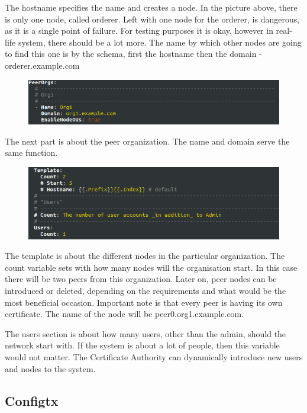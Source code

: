 \documentclass[a4paper,11pt]{report}
\begin{document}
The hostname specifies the name and creates a node. In the picture above, there is only one node, called orderer. Left with one node for the orderer, is dangerous, as it is a single point of failure. For testing purposes it is okay, however in real-life system, there should be a lot more. The name by which other nodes are going to find this one is by the schema, first the hostname then the domain - orderer.example.com

\begin{figure}[h]
\centering
  \includegraphics[width = 16cm]{cryptoconfig2.png}
  \caption{ }
  \label{cryptoconfig2}
\end{figure}

The next part is about the peer organization. The name and domain serve the same function. 

\begin{figure}[h]
\centering
  \includegraphics[width = 16cm]{cryptoconfig3.png}
  \caption{ }
  \label{cryptoconfig3}
\end{figure}

The template is about the different nodes in the particular organization. The count variable sets with how many nodes will the organisation start. In this case there will be two peers from this organization. Later on, peer nodes can be introduced or deleted, depending on the requirements and what would be the most beneficial occasion. Important note is that every peer is having its own certificate. The name of the node will be peer0.org1.example.com. 

The users section is about how many users, other than the admin, should the network start with. If the system is about a lot of people, then this variable would not matter. The Certificate Authority can dynamically introduce new users and nodes to the system. 

\subsection{Configtx}
\end{document}
